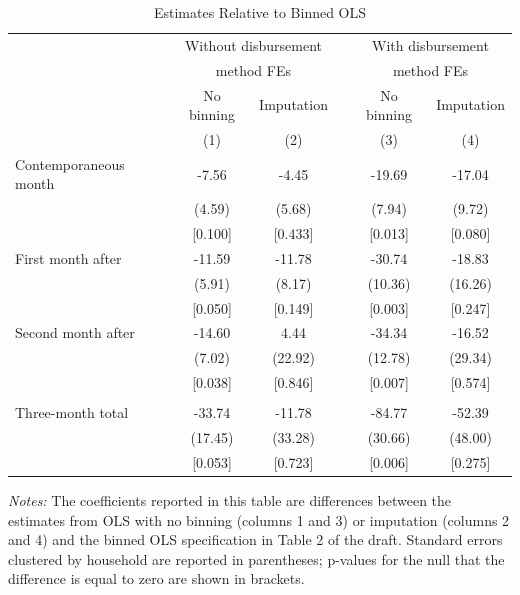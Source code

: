 \documentclass[english,11pt]{article}
\providecommand{\tabularnewline}{\\}
\theoremstyle{plain}
\theoremstyle{plain}
\theoremstyle{plain}
\theoremstyle{plain}
\let\ref\Cref
\begin{document}
\begin{table}[H]
\noindent \begin{centering}
\caption{\ref{tab:replication_BP} Estimates Relative to Binned OLS\label{tab:Coef-differences}}
\medskip{}
{\small{}}%
\begin{tabular}{lccccc}
\toprule 
 & \multicolumn{2}{c}{{\small{}Without disbursement}} &  & \multicolumn{2}{c}{{\small{}With disbursement}}\tabularnewline
 & \multicolumn{2}{c}{{\small{}method FEs}} &  & \multicolumn{2}{c}{{\small{}method FEs}}\tabularnewline
\cmidrule{2-3} \cmidrule{3-3} \cmidrule{5-6} \cmidrule{6-6} 
 & {\small{}No binning} & {\small{}Imputation} &  & {\small{}No binning} & {\small{}Imputation}\tabularnewline
 & {\small{}(1)} & {\small{}(2)} &  & {\small{}(3)} & {\small{}(4)}\tabularnewline
\midrule
{\small{}Contemporaneous month} & {\small{}-7.56} & {\small{}-4.45} &  & {\small{}-19.69} & {\small{}-17.04}\tabularnewline
 & {\small{}(4.59)} & {\small{}(5.68)} &  & {\small{}(7.94)} & {\small{}(9.72)}\tabularnewline
 & {\small{}{[}0.100{]}} & {\small{}{[}0.433{]}} &  & {\small{}{[}0.013{]}} & {\small{}{[}0.080{]}}\tabularnewline
{\small{}First month after} & {\small{}-11.59} & {\small{}-11.78} &  & {\small{}-30.74} & {\small{}-18.83}\tabularnewline
 & {\small{}(5.91)} & {\small{}(8.17)} &  & {\small{}(10.36)} & {\small{}(16.26)}\tabularnewline
 & {\small{}{[}0.050{]}} & {\small{}{[}0.149{]}} &  & {\small{}{[}0.003{]}} & {\small{}{[}0.247{]}}\tabularnewline
{\small{}Second month after} & {\small{}-14.60} & {\small{}4.44} &  & {\small{}-34.34} & {\small{}-16.52}\tabularnewline
 & {\small{}(7.02)} & {\small{}(22.92)} &  & {\small{}(12.78)} & {\small{}(29.34)}\tabularnewline
 & {\small{}{[}0.038{]}} & {\small{}{[}0.846{]}} &  & {\small{}{[}0.007{]}} & {\small{}{[}0.574{]}}\tabularnewline
 &  &  &  &  & \tabularnewline
{\small{}Three-month total} & {\small{}-33.74} & {\small{}-11.78} &  & {\small{}-84.77} & {\small{}-52.39}\tabularnewline
 & {\small{}(17.45)} & {\small{}(33.28)} &  & {\small{}(30.66)} & {\small{}(48.00)}\tabularnewline
 & {\small{}{[}0.053{]}} & {\small{}{[}0.723{]}} &  & {\small{}{[}0.006{]}} & {\small{}{[}0.275{]}}\tabularnewline
\bottomrule
\end{tabular}\medskip{}
\par\end{centering}
\noindent \raggedright{}\emph{\footnotesize{}Notes:}{\footnotesize{}
The coefficients reported in this table are differences between the
estimates from OLS with no binning (columns 1 and 3) or imputation
(columns 2 and 4) and the binned OLS specification in Table 2 of the
draft. Standard errors clustered by household are reported in parentheses;
p-values for the null that the difference is equal to zero are shown
in brackets.}{\footnotesize\par}
\end{table}
\end{document}
